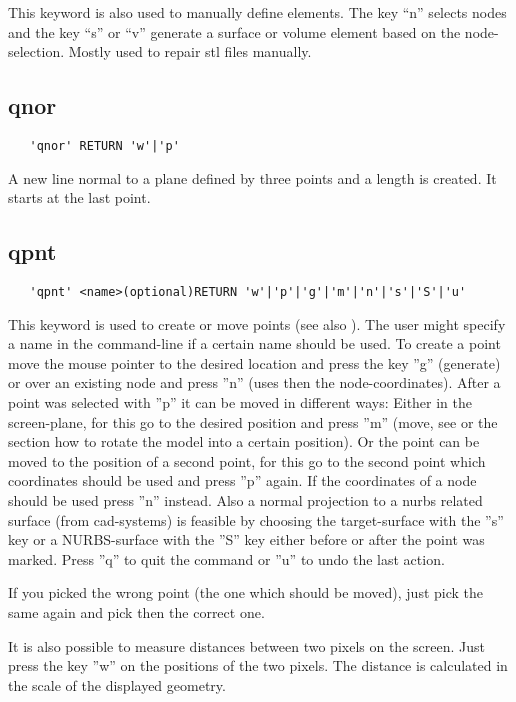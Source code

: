 \documentclass{article}
\begin{document}
This keyword is also used to manually define elements. The key ``n'' selects nodes and the key ``s'' or ``v'' generate a surface or volume element based on the node-selection. Mostly used to repair stl files manually.

\subsection{\label{qnor}qnor}
\begin{verbatim}
   'qnor' RETURN 'w'|'p'
\end{verbatim}
A new line normal to a plane defined by three points and a length is created. It starts at the last point.

\subsection{\label{qpnt}qpnt}
\begin{verbatim}
   'qpnt' <name>(optional)RETURN 'w'|'p'|'g'|'m'|'n'|'s'|'S'|'u'
\end{verbatim}
This keyword is used to create or move points (see also ). The user might specify a name in the command-line if a certain name should be used. To create a point move the mouse pointer to the desired location and press the key ''g'' (generate) or over an existing node and press ''n'' (uses then the node-coordinates). After a point was selected with ''p'' it can be moved in different ways: Either in the screen-plane, for this go to the desired position and press ''m'' (move, see  or the section  how to rotate the model into a certain position). Or the point can be moved to the position of a second point, for this go to the second point which coordinates should be used and press ''p'' again. If the coordinates of a node should be used press ''n'' instead. Also a normal projection to a nurbs related surface (from cad-systems) is feasible by choosing the target-surface with the ''s'' key or a NURBS-surface with the ''S'' key either before or after the point was marked. Press ''q'' to quit the command or ''u'' to undo the last action.

If you picked the wrong point (the one which should be moved), just pick the same again and pick then the correct one.

It is also possible to measure distances between two pixels on the screen. Just press the key ''w'' on the positions of the two pixels. The distance is calculated in the scale of the displayed geometry.  
\end{document}
